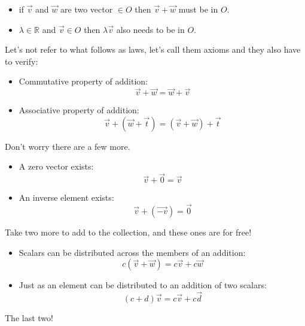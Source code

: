 \documentclass[600paper, 11pt,twoside,openany]{kdp}
\begin{document}
\begin{tcolorbox}
\begin{itemize}
\item if $\overrightarrow{v}$ and $\overrightarrow{w}$ are two vector $\in O$ then $\overrightarrow{v} +\overrightarrow{w}$ must be in $O$.
\item $\lambda \in \mathbb{R}$ and $\overrightarrow{v} \in O$ then $\lambda \overrightarrow{v}$ also needs to be in $O$.
\end{itemize}
\end{tcolorbox}
Let’s not refer to what follows as laws, let’s call them axioms and they also have to verify:
\begin{tcolorbox}
\begin{itemize}
\item Commutative property of addition:
\[\overrightarrow{v} + \overrightarrow{w} = \overrightarrow{w} + \overrightarrow{v}\]
\item Associative property of addition:
\[\overrightarrow{v} + (\overrightarrow{w} +  \overrightarrow{t}) = (\overrightarrow{v} + \overrightarrow{w}) +  \overrightarrow{t}\]
\end{itemize}
\end{tcolorbox}
Don't worry there are a few more.
\begin{tcolorbox}
\begin{itemize}
\item A zero vector exists:
\[\overrightarrow{v} + \overrightarrow{0} = \overrightarrow{v}\]
\item An inverse element exists:
\[\overrightarrow{v} + (\overrightarrow{-v}) = \overrightarrow{0}\]
\end{itemize}
\end{tcolorbox}
\indent Take two more to add to the collection, and these ones are for free!
\begin{tcolorbox}
\begin{itemize}
\item Scalars can be distributed across the members of an addition:
\[c( \overrightarrow{v} + \overrightarrow{w}) = c\overrightarrow{v} + c\overrightarrow{w}\]
\item Just as an element can be distributed to an addition of two scalars:
\[(c+d)\overrightarrow{v} = c\overrightarrow{v} + c \overrightarrow{d}\]
\end{itemize}
\end{tcolorbox}
\vspace{8pt}
\indent The last two!
\vspace{8pt}
\end{document}
